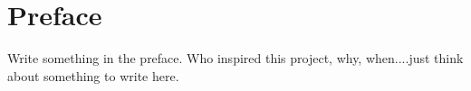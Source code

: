 \chapter{Preface}
Write something in the preface. Who inspired this project, why, 
when....just think about something to write here.